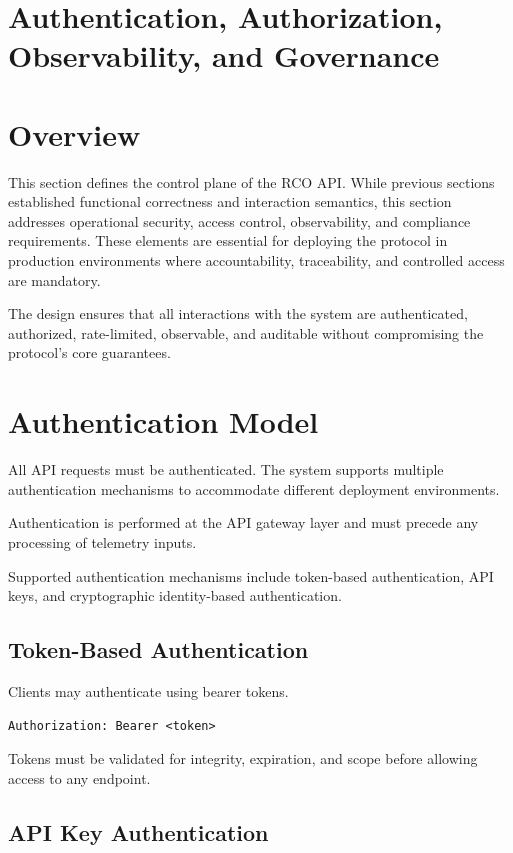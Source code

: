 \section{Authentication, Authorization, Observability, and Governance}

\section{Overview}

This section defines the control plane of the RCO API. While previous sections established functional correctness and interaction semantics, this section addresses operational security, access control, observability, and compliance requirements. These elements are essential for deploying the protocol in production environments where accountability, traceability, and controlled access are mandatory.

The design ensures that all interactions with the system are authenticated, authorized, rate-limited, observable, and auditable without compromising the protocol’s core guarantees.

\section{Authentication Model}

All API requests must be authenticated. The system supports multiple authentication mechanisms to accommodate different deployment environments.

Authentication is performed at the API gateway layer and must precede any processing of telemetry inputs.

Supported authentication mechanisms include token-based authentication, API keys, and cryptographic identity-based authentication.

\subsection{Token-Based Authentication}

Clients may authenticate using bearer tokens.

\begin{verbatim}
Authorization: Bearer <token>
\end{verbatim}

Tokens must be validated for integrity, expiration, and scope before allowing access to any endpoint.

\subsection{API Key Authentication}

